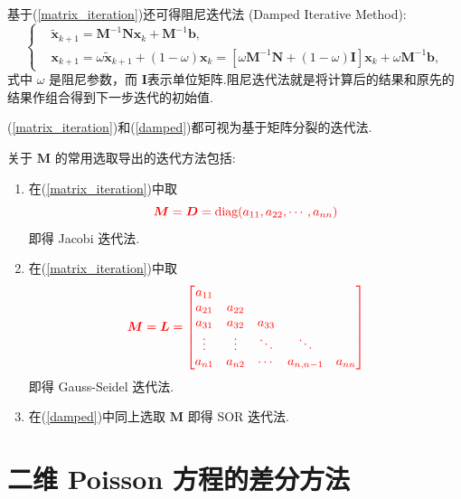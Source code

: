 基于(\ref{matrix_iteration})还可得阻尼迭代法 (Damped Iterative Method):
\begin{equation}\label{damped}
    \left\{\begin{aligned}
        &\widetilde{\boldsymbol{x}}_{k+1} = \boldsymbol{M}^{-1}\boldsymbol{N}\boldsymbol{x}_k + \boldsymbol{M}^{-1}\boldsymbol{b}, \\
        &\boldsymbol{x}_{k+1} = \omega\widetilde{\boldsymbol{x}}_{k+1} + (1 - \omega)\boldsymbol{x}_k = [\omega\boldsymbol{M}^{-1}\boldsymbol{N} + (1 - \omega)\boldsymbol{I}]\boldsymbol{x}_k + \omega\boldsymbol{M}^{-1}\boldsymbol{b},
    \end{aligned}\right.
\end{equation}
式中 $\omega$ 是阻尼参数，而 $\boldsymbol{I}$表示单位矩阵.阻尼迭代法就是将计算后的结果和原先的结果作组合得到下一步迭代的初始值.\par
(\ref{matrix_iteration})和(\ref{damped})都可视为基于矩阵分裂的迭代法.\par
关于 $\boldsymbol{M}$ 的常用选取导出的迭代方法包括:
\begin{enumerate}
    \item 在(\ref{matrix_iteration})中取
    \begin{equation*}
        {\color{red} \boldsymbol{M} = \boldsymbol{D} = \text{diag}(a_{11}, a_{22}, \cdots, a_{nn}) }
    \end{equation*}
    即得 Jacobi 迭代法.
    
    \item 在(\ref{matrix_iteration})中取
    \begin{equation*}
        {\color{red} \boldsymbol{M} = \boldsymbol{L} = 
        \begin{bmatrix}
            a_{11} & & & & \\
            a_{21} & a_{22} & & & \\
            a_{31} & a_{32} & a_{33} & & \\
            \vdots & \vdots & \ddots & \ddots & \\
            a_{n1} & a_{n2} & \cdots & a_{n,n-1} & a_{nn}
        \end{bmatrix} }
    \end{equation*}
    即得 Gauss-Seidel 迭代法.
    
    \item 在(\ref{damped})中同上选取 $\boldsymbol{M}$ 即得 SOR 迭代法.
\end{enumerate}

\section{二维 Poisson 方程的差分方法}

